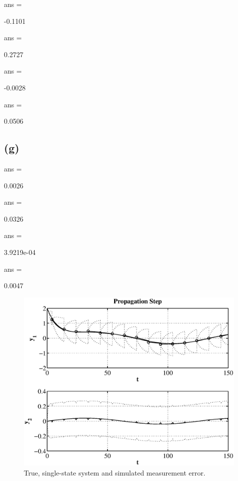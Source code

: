 \documentclass[fleqn, letterpaper]{tufte-handout}
\begin{document}
{\scriptsize
        \begin{minipage}{\linewidth}
                
        \end{minipage}
}

ans =

   -0.1101


ans =

    0.2727


ans =

   -0.0028


ans =

    0.0506

\subsection{(g)}
{\scriptsize
        \begin{minipage}{\linewidth}
                
        \end{minipage}
}
ans =

    0.0026


ans =

    0.0326


ans =

   3.9219e-04


ans =

    0.0047
\begin{figure}
        \includegraphics[width=\textwidth]{2g}
        \caption{True, single-state system and simulated measurement error.}
        \label{2g}
\end{figure}
\end{document}
